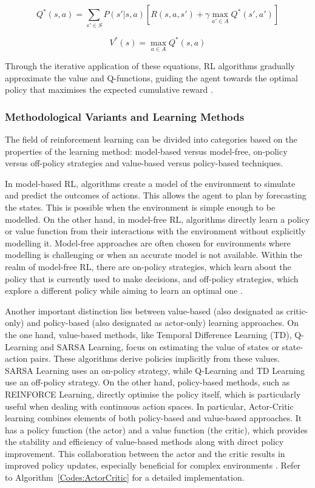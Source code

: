 \begin{equation}
Q^*(s, a) = \sum_{s' \in S} P(s'|s,a) \left[ R(s,a,s') + \gamma \max_{a' \in A} Q^*(s', a') \right]
\end{equation}

\begin{equation}
V^*(s) = \max_{a \in A} Q^*(s, a)
\end{equation}

Through the iterative application of these equations, RL algorithms gradually approximate the value and Q-functions, guiding the agent towards the optimal policy that maximises the expected cumulative reward \cite{sutton_reinforcement_2018}.

\subsubsection{Methodological Variants and Learning Methods}

The field of reinforcement learning can be divided into categories based on the properties of the learning method: model-based versus model-free, on-policy versus off-policy strategies and value-based versus policy-based techniques. 

In model-based RL, algorithms create a model of the environment to simulate and predict the outcomes of actions. This allows the agent to plan by forecasting the states. This is possible when the environment is simple enough to be modelled. On the other hand, in model-free RL, algorithms directly learn a policy or value function from their interactions with the environment without explicitly modelling it. Model-free approaches are often chosen for environments where modelling is challenging or when an accurate model is not available. Within the realm of model-free RL, there are on-policy strategies, which learn about the policy that is currently used to make decisions, and off-policy strategies, which explore a different policy while aiming to learn an optimal one \cite{sutton_reinforcement_2018}.

Another important distinction lies between value-based (also designated as critic-only) and policy-based (also designated as actor-only) learning approaches. On the one hand, value-based methods, like Temporal Difference Learning (TD), Q-Learning and SARSA Learning, focus on estimating the value of states or state-action pairs. These algorithms derive policies implicitly from these values. SARSA Learning uses an on-policy strategy, while Q-Learning and TD Learning use an off-policy strategy. On the other hand, policy-based methods, such as REINFORCE Learning, directly optimise the policy itself, which is particularly useful when dealing with continuous action spaces. In particular, Actor-Critic learning combines elements of both policy-based and value-based approaches. It has a policy function (the actor) and a value function (the critic), which provides the stability and efficiency of value-based methods along with direct policy improvement. This collaboration between the actor and the critic results in improved policy updates, especially beneficial for complex environments \cite{sutton_reinforcement_2018}. Refer to Algorithm~\ref{Codes:ActorCritic} for a detailed implementation.

